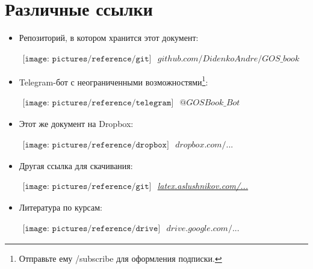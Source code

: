 {\let\clearpage\relax\chapter{Различные ссылки}}
\begin{itemize}
\item

Репозиторий, в котором хранится этот документ:

$
\begin{array}{l}
\texttt{[image: pictures/reference/git]}
\end{array}
$ \href{https://github.com/DidenkoAndre/GOS_book}{$github.com/DidenkoAndre/GOS\_book$}

\item

Telegram-бот с неограниченными возможностями\footnote{Отправьте ему \textsf{/subscribe} для оформления подписки.}:

$
\begin{array}{l}
\texttt{[image: pictures/reference/telegram]}
\end{array}
$
\href{https://t.me/GOSBook_Bot}{\textcolor{Purplemountainmajesty}{$@GOSBook\_Bot$}} 

\item

Этот же документ на Dropbox:

$
\begin{array}{l}
\texttt{[image: pictures/reference/dropbox]}
\end{array}
$ \href{https://www.dropbox.com/sh/7e5mfj8q68o2ipp/AAD8XvpZhiJzFbEh_IeH305ia?dl=0&preview=GOSBook.pdf}{$dropbox.com/...$}

\item 

Другая ссылка для скачивания:

$
\begin{array}{l}
\texttt{[image: pictures/reference/git]}
\end{array}
$
\href{http://latex.aslushnikov.com/compile?git=https://github.com/DidenkoAndre/GOS_book&target=_main.tex}{\large \textcolor{Purplemountainmajesty}{\textit{latex.aslushnikov.com/...}}}

\item
Литература по курсам:

$
\begin{array}{l}
\texttt{[image: pictures/reference/drive]}
\end{array}
$
\href{https://drive.google.com/drive/u/0/folders/0BzuzEyNkpwYDcENXcV9jNWdwVlU}{$drive.google.com/...$}


\end{itemize}
